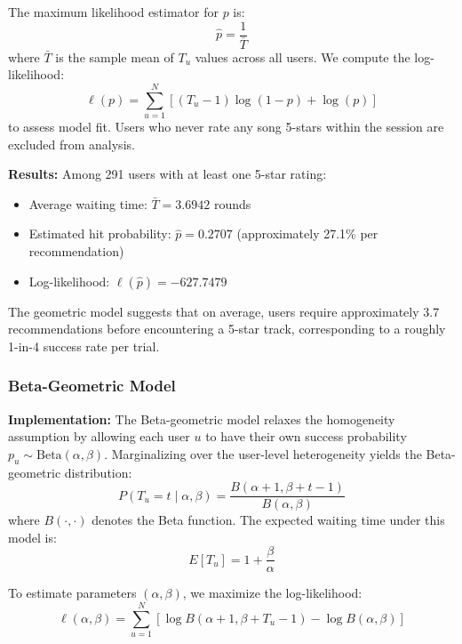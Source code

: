 \documentclass[12pt,a4paper]{article}
\begin{document}
The maximum likelihood estimator for $p$ is:
\begin{equation}
\hat{p} = \frac{1}{\bar{T}}
\end{equation}
where $\bar{T}$ is the sample mean of $T_u$ values across all users. We compute the log-likelihood:
\begin{equation}
\ell(p) = \sum_{u=1}^{N} \left[ (T_u - 1) \log(1-p) + \log(p) \right]
\end{equation}
to assess model fit. Users who never rate any song 5-stars within the session are excluded from analysis.

\textbf{Results:} Among 291 users with at least one 5-star rating:
\begin{itemize}
    \item Average waiting time: $\bar{T} = 3.6942$ rounds
    \item Estimated hit probability: $\hat{p} = 0.2707$ (approximately 27.1\% per recommendation)
    \item Log-likelihood: $\ell(\hat{p}) = -627.7479$
\end{itemize}

The geometric model suggests that on average, users require approximately 3.7 recommendations before encountering a 5-star track, corresponding to a roughly 1-in-4 success rate per trial.

\subsubsection{Beta-Geometric Model}

\textbf{Implementation:} The Beta-geometric model relaxes the homogeneity assumption by allowing each user $u$ to have their own success probability $p_u \sim \text{Beta}(\alpha, \beta)$. Marginalizing over the user-level heterogeneity yields the Beta-geometric distribution:
\begin{equation}
P(T_u = t \mid \alpha, \beta) = \frac{B(\alpha + 1, \beta + t - 1)}{B(\alpha, \beta)}
\end{equation}
where $B(\cdot, \cdot)$ denotes the Beta function. The expected waiting time under this model is:
\begin{equation}
E[T_u] = 1 + \frac{\beta}{\alpha}
\end{equation}

To estimate parameters $(\alpha, \beta)$, we maximize the log-likelihood:
\begin{equation}
\ell(\alpha, \beta) = \sum_{u=1}^{N} \left[ \log B(\alpha + 1, \beta + T_u - 1) - \log B(\alpha, \beta) \right]
\end{equation}
\end{document}
